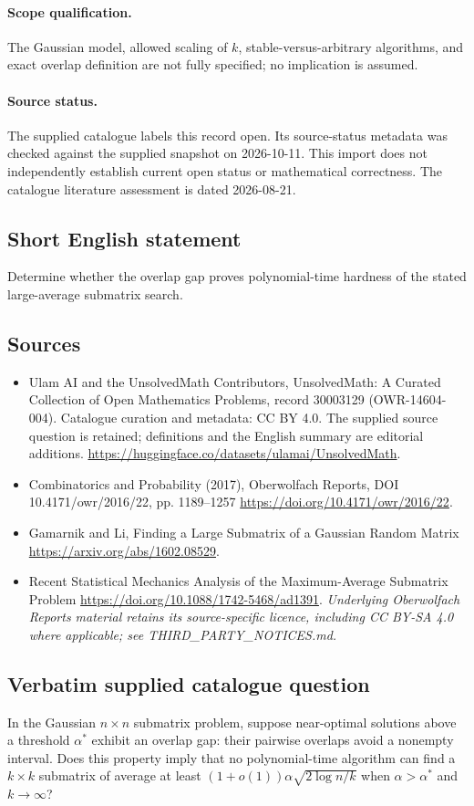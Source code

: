 \documentclass[11pt]{article}
\begin{document}
\paragraph{Scope qualification.}
The Gaussian model, allowed scaling of $k$, stable-versus-arbitrary algorithms, and exact overlap definition are not fully specified; no implication is assumed.
\paragraph{Source status.}
The supplied catalogue labels this record open. Its source-status metadata was checked against the supplied snapshot on 2026-10-11. This import does not independently establish current open status or mathematical correctness. The catalogue literature assessment is dated 2026-08-21.
\subsection{Short English statement}
Determine whether the overlap gap proves polynomial-time hardness of the stated large-average submatrix search.
\subsection{Sources}
\begin{itemize}
\item[S1] Ulam AI and the UnsolvedMath Contributors, UnsolvedMath: A Curated Collection of Open Mathematics Problems, record 30003129 (OWR-14604-004). Catalogue curation and metadata: CC BY 4.0. The supplied source question is retained; definitions and the English summary are editorial additions.
\url{https://huggingface.co/datasets/ulamai/UnsolvedMath}.
\item[S2] Combinatorics and Probability (2017), Oberwolfach Reports, DOI 10.4171/owr/2016/22, pp. 1189--1257
\url{https://doi.org/10.4171/owr/2016/22}.
\item[S3] Gamarnik and Li, Finding a Large Submatrix of a Gaussian Random Matrix
\url{https://arxiv.org/abs/1602.08529}.
\item[S4] Recent Statistical Mechanics Analysis of the Maximum-Average Submatrix Problem
\url{https://doi.org/10.1088/1742-5468/ad1391}.
\textit{Underlying Oberwolfach Reports material retains its source-specific licence, including CC BY-SA 4.0 where applicable; see THIRD\_PARTY\_NOTICES.md.}
\end{itemize}
\subsection{Verbatim supplied catalogue question}
In the Gaussian $n\times n$ submatrix problem, suppose near-optimal solutions above a threshold $\alpha^*$ exhibit an overlap gap: their pairwise overlaps avoid a nonempty interval. Does this property imply that no polynomial-time algorithm can find a $k\times k$ submatrix of average at least $(1+o(1))\alpha\sqrt{2\log n/k}$ when $\alpha>\alpha^*$ and $k\to\infty$?
\end{document}
